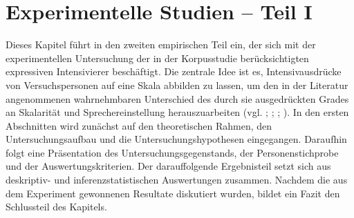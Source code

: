 






\chapter{{Experimentelle Studien -- Teil I}} \label{Experiment0}
Dieses Kapitel führt in den zweiten empirischen Teil ein, der sich mit der experimentellen Untersuchung der in der Korpusstudie berücksichtigten expressiven Intensivierer beschäftigt. Die zentrale Idee ist es, Intensivausdrücke von Versuchspersonen auf eine Skala abbilden zu lassen, um den in der Literatur angenommenen wahrnehmbaren Unterschied des durch sie ausgedrückten Grades an Skalarität und Sprechereinstellung herauszuarbeiten (vgl. {\citealt[315]{Lang.1983}}; {\citealt[22]{Paradis.1997}}; \citealt[57]{Ortner.2014}; {\citealt[133]{Gutzmann.2019a}}). In den ersten Abschnitten wird zunächst auf den theoretischen Rahmen, den Untersuchungsaufbau und die Untersuchungshypothesen eingegangen. Daraufhin folgt eine Präsentation des Untersuchungsgegenstands, der Personenstichprobe und der Auswertungskriterien. Der darauffolgende Ergebnisteil setzt sich aus deskriptiv- und inferenzstatistischen Auswertungen zusammen. Nachdem die aus dem Experiment gewonnenen Resultate diskutiert wurden, bildet ein Fazit den Schlussteil des Kapitels.





